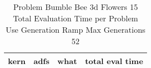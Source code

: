\begin{table}[H]
\caption{Problem  Bumble Bee 3d  Flowers 15\\Total Evaluation Time per Problem \\ Use Generation Ramp  Max Generations 52\\}
\begin{center}
\scalebox{1.0} %
{
\begin{tabular}{lllr}
\hline
kern & adfs & what & total eval time \\
\hline


\end{tabular}
}
\end{center}
\end{table}

